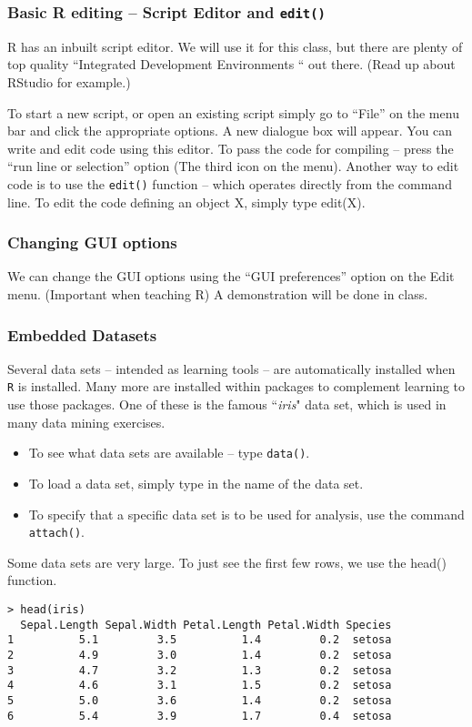 \documentclass{beamer}
\begin{document}
\begin{frame}

\frametitle{Basic R editing – Script Editor and \texttt{edit()}}
R has an inbuilt script editor. We will use it for this class, but there are plenty of top quality “Integrated Development Environments “ out there. (Read up about RStudio for  example.)

To start a new script, or open an existing script simply go to “File” on the menu bar and click the appropriate options.
A new dialogue box will appear. You can write and edit code using this editor.
To pass the code for compiling – press the “run line or selection” option (The third icon on the menu).
Another way to edit code is to use the \texttt{edit()} function – which operates directly from the command line.  To edit the code defining an object X, simply type edit(X).
\end{frame}
\begin{frame}[fragile]
\frametitle{Changing GUI options}
We can change the GUI options using the “GUI preferences” option on the Edit menu. (Important when teaching R)
A demonstration will be done in class. 
\end{frame}
\begin{frame}[fragile]
\frametitle{Embedded Datasets}
Several data sets – intended as learning tools – are automatically installed when \texttt{R} is installed. Many more are installed within packages to complement learning to use those packages.  One of these is the famous ``\textit{iris}" data set, which is used in many data mining exercises.
\begin{itemize}
\item To see what data sets are available – type \texttt{data()}.
\item To load a data set, simply type in the name of the data set. 
\item To specify that a specific data set is to be used for analysis, use the command \texttt{attach()}.

\end{itemize}
\end{frame}
\begin{frame}[fragile]
Some data sets are very large. To just see the first few rows, we use the head() function.
{
\small
\begin{framed}
\begin{verbatim}
> head(iris)
  Sepal.Length Sepal.Width Petal.Length Petal.Width Species
1          5.1         3.5          1.4         0.2  setosa
2          4.9         3.0          1.4         0.2  setosa
3          4.7         3.2          1.3         0.2  setosa
4          4.6         3.1          1.5         0.2  setosa
5          5.0         3.6          1.4         0.2  setosa
6          5.4         3.9          1.7         0.4  setosa
\end{verbatim}
\end{framed}
}
\end{frame}
\end{document}
